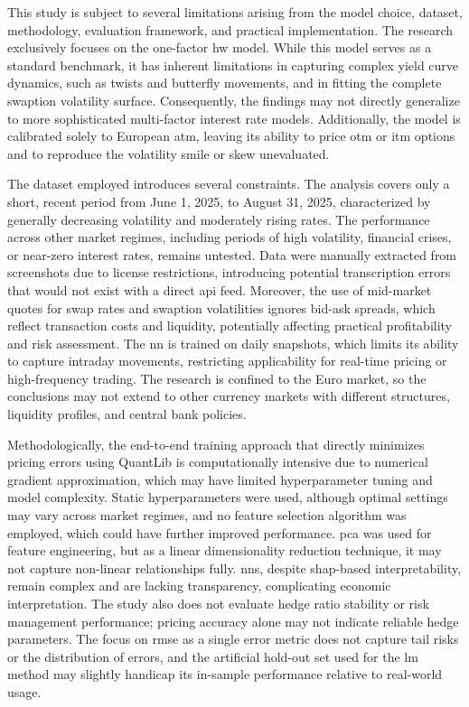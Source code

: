 This study is subject to several limitations arising from the model choice, dataset, methodology, evaluation framework, and practical implementation. The research exclusively focuses on the one-factor \ac{hw} model. While this model serves as a standard benchmark, it has inherent limitations in capturing complex yield curve dynamics, such as twists and butterfly movements, and in fitting the complete swaption volatility surface. Consequently, the findings may not directly generalize to more sophisticated multi-factor interest rate models. Additionally, the model is calibrated solely to European \ac{atm}, leaving its ability to price \ac{otm} or \ac{itm} options and to reproduce the volatility smile or skew unevaluated.  

The dataset employed introduces several constraints. The analysis covers only a short, recent period from June 1, 2025, to August 31, 2025, characterized by generally decreasing volatility and moderately rising rates. The performance across other market regimes, including periods of high volatility, financial crises, or near-zero interest rates, remains untested. Data were manually extracted from screenshots due to license restrictions, introducing potential transcription errors that would not exist with a direct \ac{api} feed. Moreover, the use of mid-market quotes for swap rates and swaption volatilities ignores bid-ask spreads, which reflect transaction costs and liquidity, potentially affecting practical profitability and risk assessment. The \ac{nn} is trained on daily snapshots, which limits its ability to capture intraday movements, restricting applicability for real-time pricing or high-frequency trading. The research is confined to the Euro market, so the conclusions may not extend to other currency markets with different structures, liquidity profiles, and central bank policies.  

Methodologically, the end-to-end training approach that directly minimizes pricing errors using QuantLib is computationally intensive due to numerical gradient approximation, which may have limited hyperparameter tuning and model complexity. Static hyperparameters were used, although optimal settings may vary across market regimes, and no feature selection algorithm was employed, which could have further improved performance. \ac{pca} was used for feature engineering, but as a linear dimensionality reduction technique, it may not capture non-linear relationships fully. \ac{nn}s, despite \ac{shap}-based interpretability, remain complex and are lacking transparency, complicating economic interpretation. The study also does not evaluate hedge ratio stability or risk management performance; pricing accuracy alone may not indicate reliable hedge parameters. The focus on \ac{rmse} as a single error metric does not capture tail risks or the distribution of errors, and the artificial hold-out set used for the \ac{lm} method may slightly handicap its in-sample performance relative to real-world usage.  

